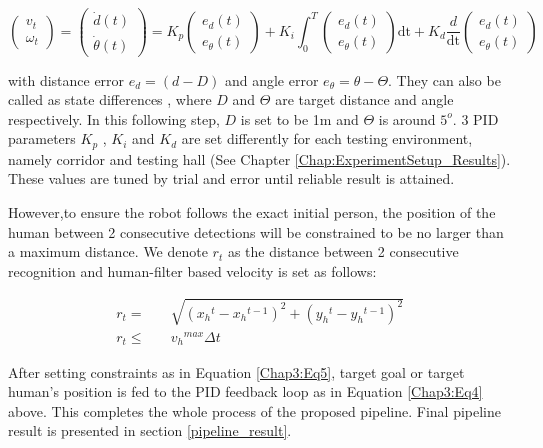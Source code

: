 \begin{equation} \renewcommand{\arraystretch}{1.8}
    \label{Chap3:Eq4}
    \begin{pmatrix}
        v_t \\ \omega_{t}
    \end{pmatrix}=
    \begin{pmatrix}
        \dot{d}(t) \\ \dot{\theta} (t)
    \end{pmatrix}= K_p \begin{pmatrix}
        e_d (t) \\e_{\theta} (t)
    \end{pmatrix} + K_i \int_{0}^{T} \begin{pmatrix}
        e_d (t) \\e_{\theta} (t)
    \end{pmatrix} \mathrm{dt} + K_d \frac{d}{\mathrm{dt}} \begin{pmatrix}
        e_d (t) \\e_{\theta} (t)
    \end{pmatrix}
\end{equation}

with distance error $e_d = (d - D)$ and angle error $e_{\theta} = \theta - \Theta$. They can
also be called as state differences , where $D$ and $\Theta$ are target distance and angle respectively.
In this following step, $D$ is set to be 1m and $\Theta$ is around $5^o$. 3 PID parameters $K_p$ , $K_i$ and $K_d$
are set differently for each testing environment, namely corridor and testing hall (See Chapter \ref{Chap:ExperimentSetup_Results}). These values
are tuned by trial and error until reliable result is attained.

However,to ensure the robot follows the exact
initial person, the position of the human between 2 consecutive detections will be constrained to be no larger
than a maximum distance. We denote $r_t$ as the distance between 2 consecutive recognition and human-filter based velocity is set
as follows:

\begin{equation}
    \label{Chap3:Eq5}
    \begin{split}
        r_t = \quad & \sqrt{({x_h}^t - {x_h}^{t-1})^2 + ({y_h}^t - {y_h}^{t-1})^2} \\
        r_t \leq  \quad &  {v_h}^{max} \Delta t
    \end{split}
\end{equation}

After setting constraints as in Equation \ref{Chap3:Eq5}, target goal or target human's position is fed to the PID
feedback loop as in Equation \ref{Chap3:Eq4} above. This completes the whole process of the proposed pipeline. Final pipeline
result is presented in section \ref{pipeline_result}.